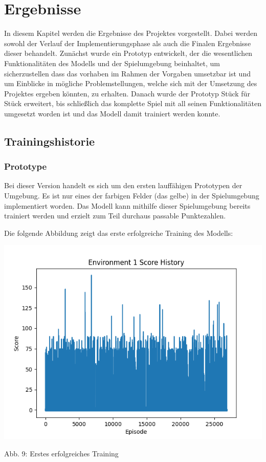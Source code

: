 \section{Ergebnisse}
In diesem Kapitel werden die Ergebnisse des Projektes vorgestellt. Dabei werden sowohl der Verlauf der Implementierungsphase als auch die Finalen Ergebnisse dieser behandelt. Zunächst wurde ein Prototyp entwickelt, der die wesentlichen Funktionalitäten des Modells und der Spielumgebung beinhaltet, um sicherzustellen dass das vorhaben im Rahmen der Vorgaben umsetzbar ist und um Einblicke in mögliche Problemstellungen, welche sich mit der Umsetzung des Projektes ergeben könnten, zu erhalten. Danach wurde der Prototyp Stück für Stück erweitert, bis schließlich das komplette Spiel mit all seinen Funktionalitäten umgesetzt worden ist und das Modell damit trainiert werden konnte.
\subsection{Trainingshistorie}
\subsubsection{Prototype}
Bei dieser Version handelt es sich um den ersten lauffähigen Prototypen der Umgebung. Es ist nur eines der farbigen Felder (das gelbe) in der Spielumgebung implementiert worden. Das Modell kann mithilfe dieser Spielumgebung bereits trainiert werden und erzielt zum Teil durchaus passable Punktezahlen.

\begin{minipage}{\linewidth}
	Die folgende Abbildung zeigt das erste erfolgreiche Training des Modells:
	
	\vspace{0.5cm}
	\includegraphics[width=1\textwidth]{Bilder/firstpropertraining}
	
	Abb. 9: Erstes erfolgreiches Training\\
\end{minipage}

